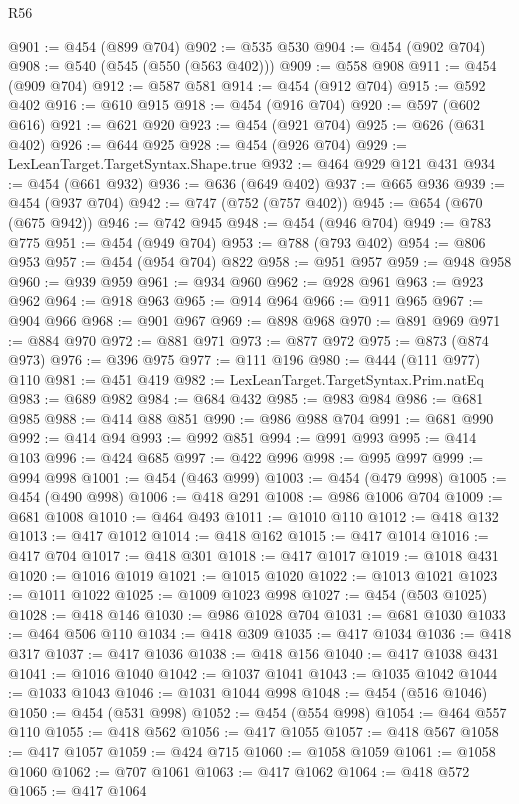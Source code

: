 \begin{lexlean}{R56}
\begin{coremodule}
@901 := @454 (@899 @704)
@902 := @535 @530
@904 := @454 (@902 @704)
@908 := @540 (@545 (@550 (@563 @402)))
@909 := @558 @908
@911 := @454 (@909 @704)
@912 := @587 @581
@914 := @454 (@912 @704)
@915 := @592 @402
@916 := @610 @915
@918 := @454 (@916 @704)
@920 := @597 (@602 @616)
@921 := @621 @920
@923 := @454 (@921 @704)
@925 := @626 (@631 @402)
@926 := @644 @925
@928 := @454 (@926 @704)
@929 := LexLeanTarget.TargetSyntax.Shape.true
@932 := @464 @929 @121 @431
@934 := @454 (@661 @932)
@936 := @636 (@649 @402)
@937 := @665 @936
@939 := @454 (@937 @704)
@942 := @747 (@752 (@757 @402))
@945 := @654 (@670 (@675 @942))
@946 := @742 @945
@948 := @454 (@946 @704)
@949 := @783 @775
@951 := @454 (@949 @704)
@953 := @788 (@793 @402)
@954 := @806 @953
@957 := @454 (@954 @704) @822
@958 := @951 @957
@959 := @948 @958
@960 := @939 @959
@961 := @934 @960
@962 := @928 @961
@963 := @923 @962
@964 := @918 @963
@965 := @914 @964
@966 := @911 @965
@967 := @904 @966
@968 := @901 @967
@969 := @898 @968
@970 := @891 @969
@971 := @884 @970
@972 := @881 @971
@973 := @877 @972
@975 := @873 (@874 @973)
@976 := @396 @975
@977 := @111 @196
@980 := @444 (@111 @977) @110
@981 := @451 @419
@982 := LexLeanTarget.TargetSyntax.Prim.natEq
@983 := @689 @982
@984 := @684 @432
@985 := @983 @984
@986 := @681 @985
@988 := @414 @88 @851
@990 := @986 @988 @704
@991 := @681 @990
@992 := @414 @94
@993 := @992 @851
@994 := @991 @993
@995 := @414 @103
@996 := @424 @685
@997 := @422 @996
@998 := @995 @997
@999 := @994 @998
@1001 := @454 (@463 @999)
@1003 := @454 (@479 @998)
@1005 := @454 (@490 @998)
@1006 := @418 @291
@1008 := @986 @1006 @704
@1009 := @681 @1008
@1010 := @464 @493
@1011 := @1010 @110
@1012 := @418 @132
@1013 := @417 @1012
@1014 := @418 @162
@1015 := @417 @1014
@1016 := @417 @704
@1017 := @418 @301
@1018 := @417 @1017
@1019 := @1018 @431
@1020 := @1016 @1019
@1021 := @1015 @1020
@1022 := @1013 @1021
@1023 := @1011 @1022
@1025 := @1009 @1023 @998
@1027 := @454 (@503 @1025)
@1028 := @418 @146
@1030 := @986 @1028 @704
@1031 := @681 @1030
@1033 := @464 @506 @110
@1034 := @418 @309
@1035 := @417 @1034
@1036 := @418 @317
@1037 := @417 @1036
@1038 := @418 @156
@1040 := @417 @1038 @431
@1041 := @1016 @1040
@1042 := @1037 @1041
@1043 := @1035 @1042
@1044 := @1033 @1043
@1046 := @1031 @1044 @998
@1048 := @454 (@516 @1046)
@1050 := @454 (@531 @998)
@1052 := @454 (@554 @998)
@1054 := @464 @557 @110
@1055 := @418 @562
@1056 := @417 @1055
@1057 := @418 @567
@1058 := @417 @1057
@1059 := @424 @715
@1060 := @1058 @1059
@1061 := @1058 @1060
@1062 := @707 @1061
@1063 := @417 @1062
@1064 := @418 @572
@1065 := @417 @1064

\end{coremodule}
\end{lexlean}
